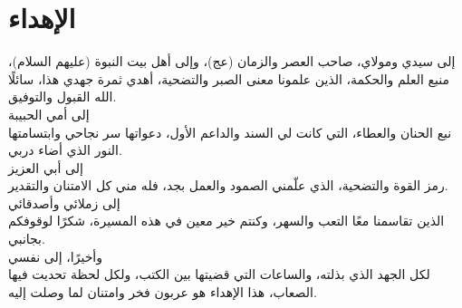 \chapter*{الإهداء}
\begin{center}
إلى سيدي ومولاي، صاحب العصر والزمان (عج)، وإلى أهل بيت النبوة (عليهم السلام)، منبع العلم والحكمة، الذين علمونا معنى الصبر والتضحية، أهدي ثمرة جهدي هذا، سائلًا الله القبول والتوفيق.\\[15pt]
إلى أمي الحبيبة\\ نبع الحنان والعطاء، التي كانت لي السند والداعم الأول، دعواتها سر نجاحي وابتسامتها النور الذي أضاء دربي.\\[15pt]
إلى أبي العزيز\\ رمز القوة والتضحية، الذي علّمني الصمود والعمل بجد، فله مني كل الامتنان والتقدير.\\[15pt]
إلى زملائي وأصدقائي\\ الذين تقاسمنا معًا التعب والسهر، وكنتم خير معين في هذه المسيرة، شكرًا لوقوفكم بجانبي.\\[15pt]
وأخيرًا، إلى نفسي\\ لكل الجهد الذي بذلته، والساعات التي قضيتها بين الكتب، ولكل لحظة تحديت فيها الصعاب، هذا الإهداء هو عربون فخر وامتنان لما وصلت إليه.
\end{center}